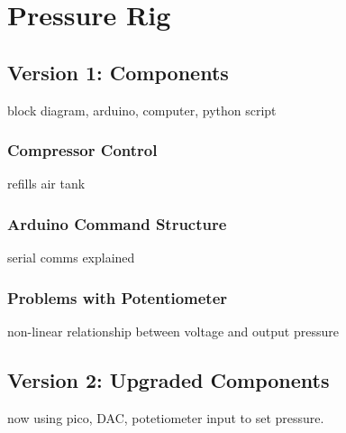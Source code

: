 \chapter{Pressure Rig}
\section{Version 1: Components}
block diagram, arduino, computer, python script
\subsection{Compressor Control}
refills air tank 
\subsection{Arduino Command Structure}
serial comms explained
\subsection{Problems with Potentiometer}
non-linear relationship between voltage and output pressure 

\section{Version 2: Upgraded Components}
now using pico, DAC, potetiometer input to set pressure.